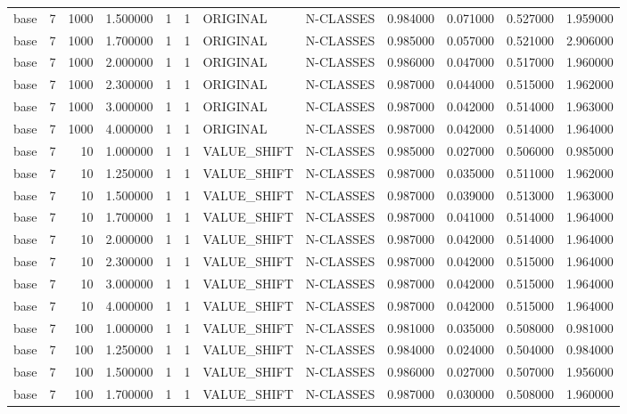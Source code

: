 \begin{tabular}{lrrrllllrrrr}
base & 7 & 1000 & 1.500000 & 1 & 1 & ORIGINAL & N-CLASSES & 0.984000 & 0.071000 & 0.527000 & 1.959000 \\
base & 7 & 1000 & 1.700000 & 1 & 1 & ORIGINAL & N-CLASSES & 0.985000 & 0.057000 & 0.521000 & 2.906000 \\
base & 7 & 1000 & 2.000000 & 1 & 1 & ORIGINAL & N-CLASSES & 0.986000 & 0.047000 & 0.517000 & 1.960000 \\
base & 7 & 1000 & 2.300000 & 1 & 1 & ORIGINAL & N-CLASSES & 0.987000 & 0.044000 & 0.515000 & 1.962000 \\
base & 7 & 1000 & 3.000000 & 1 & 1 & ORIGINAL & N-CLASSES & 0.987000 & 0.042000 & 0.514000 & 1.963000 \\
base & 7 & 1000 & 4.000000 & 1 & 1 & ORIGINAL & N-CLASSES & 0.987000 & 0.042000 & 0.514000 & 1.964000 \\
base & 7 & 10 & 1.000000 & 1 & 1 & VALUE_SHIFT & N-CLASSES & 0.985000 & 0.027000 & 0.506000 & 0.985000 \\
base & 7 & 10 & 1.250000 & 1 & 1 & VALUE_SHIFT & N-CLASSES & 0.987000 & 0.035000 & 0.511000 & 1.962000 \\
base & 7 & 10 & 1.500000 & 1 & 1 & VALUE_SHIFT & N-CLASSES & 0.987000 & 0.039000 & 0.513000 & 1.963000 \\
base & 7 & 10 & 1.700000 & 1 & 1 & VALUE_SHIFT & N-CLASSES & 0.987000 & 0.041000 & 0.514000 & 1.964000 \\
base & 7 & 10 & 2.000000 & 1 & 1 & VALUE_SHIFT & N-CLASSES & 0.987000 & 0.042000 & 0.514000 & 1.964000 \\
base & 7 & 10 & 2.300000 & 1 & 1 & VALUE_SHIFT & N-CLASSES & 0.987000 & 0.042000 & 0.515000 & 1.964000 \\
base & 7 & 10 & 3.000000 & 1 & 1 & VALUE_SHIFT & N-CLASSES & 0.987000 & 0.042000 & 0.515000 & 1.964000 \\
base & 7 & 10 & 4.000000 & 1 & 1 & VALUE_SHIFT & N-CLASSES & 0.987000 & 0.042000 & 0.515000 & 1.964000 \\
base & 7 & 100 & 1.000000 & 1 & 1 & VALUE_SHIFT & N-CLASSES & 0.981000 & 0.035000 & 0.508000 & 0.981000 \\
base & 7 & 100 & 1.250000 & 1 & 1 & VALUE_SHIFT & N-CLASSES & 0.984000 & 0.024000 & 0.504000 & 0.984000 \\
base & 7 & 100 & 1.500000 & 1 & 1 & VALUE_SHIFT & N-CLASSES & 0.986000 & 0.027000 & 0.507000 & 1.956000 \\
base & 7 & 100 & 1.700000 & 1 & 1 & VALUE_SHIFT & N-CLASSES & 0.987000 & 0.030000 & 0.508000 & 1.960000 \\

\end{tabular}
